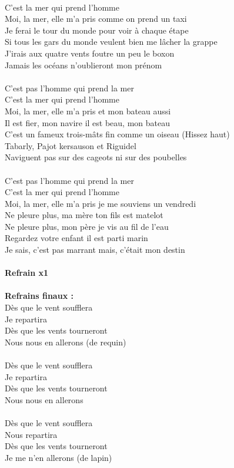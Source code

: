 \\C'est la mer qui prend l'homme
\\Moi, la mer, elle m'a pris comme on prend un taxi
\\Je ferai le tour du monde pour voir à chaque étape
\\Si tous les gars du monde veulent bien me lâcher la grappe
\\J'irais aux quatre vents foutre un peu le boxon
\\Jamais les océans n'oublieront mon prénom
\\\\C'est pas l'homme qui prend la mer
\\C'est la mer qui prend l'homme
\\Moi, la mer, elle m'a pris et mon bateau aussi
\\Il est fier, mon navire il est beau, mon bateau
\\C'est un fameux trois-mâts fin comme un oiseau (Hissez haut)
\\Tabarly, Pajot kersauson et Riguidel
\\Naviguent pas sur des cageots ni sur des poubelles
\\\\C'est pas l'homme qui prend la mer
\\C'est la mer qui prend l'homme
\\Moi, la mer, elle m'a pris je me souviens un vendredi
\\Ne pleure plus, ma mère ton fils est matelot
\\Ne pleure plus, mon père je vis au fil de l'eau
\\Regardez votre enfant il est parti marin
\\Je sais, c'est pas marrant mais, c'était mon destin
\\\\\textbf{Refrain x1}
\\\\\textbf{Refrains finaux :}
\\Dès que le vent soufflera
\\Je repartira
\\Dès que les vents tourneront
\\Nous nous en allerons (de requin)
\\\\Dès que le vent soufflera
\\Je repartira
\\Dès que les vents tourneront
\\Nous nous en allerons
\\\\Dès que le vent soufflera
\\Nous repartira
\\Dès que les vents tourneront
\\Je me n'en allerons (de lapin)


\breakpage